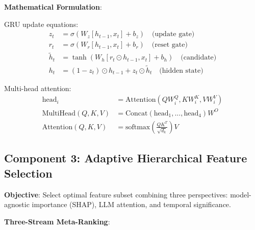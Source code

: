 \textbf{Mathematical Formulation}:

GRU update equations:
\begin{align}
z_t &= \sigma(W_z [h_{t-1}, x_t] + b_z) \quad \text{(update gate)} \\
r_t &= \sigma(W_r [h_{t-1}, x_t] + b_r) \quad \text{(reset gate)} \\
\tilde{h}_t &= \tanh(W_h [r_t \odot h_{t-1}, x_t] + b_h) \quad \text{(candidate)} \\
h_t &= (1 - z_t) \odot h_{t-1} + z_t \odot \tilde{h}_t \quad \text{(hidden state)}
\end{align}

Multi-head attention:
\begin{align}
\text{head}_i &= \text{Attention}(Q W_i^Q, K W_i^K, V W_i^V) \\
\text{MultiHead}(Q, K, V) &= \text{Concat}(\text{head}_1, ..., \text{head}_4) W^O \\
\text{Attention}(Q, K, V) &= \text{softmax}\left(\frac{QK^T}{\sqrt{d_k}}\right) V
\end{align}

\subsection{Component 3: Adaptive Hierarchical Feature Selection}

\textbf{Objective}: Select optimal feature subset combining three perspectives: model-agnostic importance (SHAP), LLM attention, and temporal significance.

\textbf{Three-Stream Meta-Ranking}:

